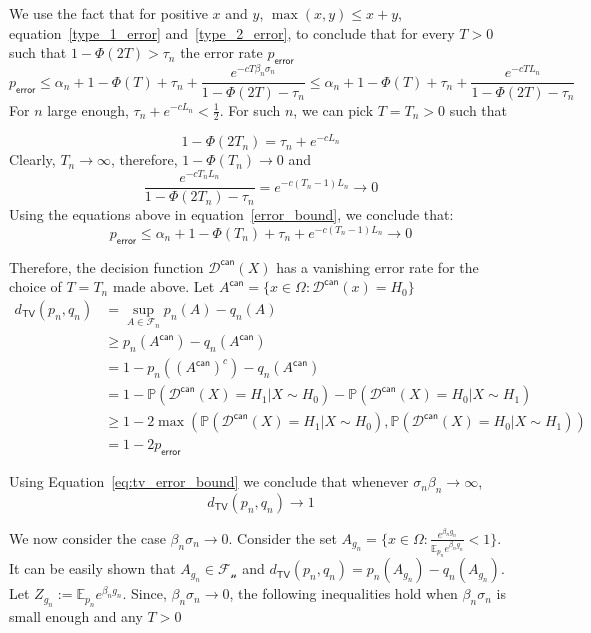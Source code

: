 \documentclass[final,12pt]{colt2018}
\begin{document}
We use the fact that for positive $x$ and $y$, $\max(x,y) \leq x+y$, equation~\eqref{type_1_error} and~\eqref{type_2_error}, to conclude that for every $T >0$ such that $1-\Phi(2T) > \tau_n$ the error rate $p_{\mathsf{error}}$
\begin{equation}
p_{\mathsf{error}}  \leq \alpha_n + 1 - \Phi(T) + \tau_n + \frac{e^{-cT\beta_n\sigma_n }}{1-\Phi(2T) - \tau_n} \leq \alpha_n + 1 - \Phi(T) + \tau_n + \frac{e^{-cTL_n }}{1-\Phi(2T) - \tau_n}   \label{error_bound}
\end{equation}
For $n$ large enough, $\tau_n + e^{-cL_n} < \frac{1}{2}$. For such $n$, we can pick $T = T_n > 0$ such that

$$1-\Phi(2T_n) = \tau_n + e^{-cL_n}$$
Clearly, $T_n \to \infty$, therefore, $1-\Phi(T_n) \to 0$ and $$\frac{e^{-cT_nL_n }}{1-\Phi(2T_n) - \tau_n} = e^{-c(T_n-1)L_n } \to 0$$
Using the equations above in equation~\eqref{error_bound}, we conclude that:
$$p_{\mathsf{error}} \leq \alpha_n + 1 - \Phi(T_n) + \tau_n + e^{-c(T_n-1)L_n} \to 0$$

Therefore, the decision function $\mathcal{D}^{\mathsf{can}}(X)$ has a vanishing error rate for the choice of $T = T_n$ made above. Let $A^{\mathsf{can}} = \{x\in \Omega: \mathcal{D}^{\mathsf{can}}(x) = H_0\}$ 
\begin{align}
d_{\mathsf{TV}}(p_n,q_n) &= \sup_{A \in \mathcal{F}_n}p_n(A)-q_n(A)\nonumber \\
&\geq p_n(A^{\mathsf{can}}) - q_n(A^{\mathsf{can}})\nonumber \\
&=1- p_n\left((A^{\mathsf{can}})^{c}\right) - q_n(A^{\mathsf{can}})\nonumber \\
&= 1 - \mathbb{P}(\mathcal{D}^{\mathsf{can}}(X) = H_1| X \sim H_0) - \mathbb{P}(\mathcal{D}^{\mathsf{can}}(X) = H_0| X \sim H_1)\nonumber\\
&\geq 1 - 2\max(\mathbb{P}(\mathcal{D}^{\mathsf{can}}(X) = H_1| X \sim H_0),\mathbb{P}(\mathcal{D}^{\mathsf{can}}(X) = H_0| X \sim H_1))\nonumber\\
&= 1-2p_{\mathsf{error}} \label{eq:tv_error_bound}
\end{align}

Using Equation~\eqref{eq:tv_error_bound} we conclude that whenever $\sigma_n\beta_n \to \infty$,
$$d_{\mathsf{TV}}(p_n,q_n) \to 1$$ 


We now consider the case $\beta_n\sigma_n \to 0$.
Consider the set $A_{g_n} = \{x \in \Omega : \frac{e^{\beta_n g_n}}{\mathbb{E}_{p_n} e^{\beta_n g_n}} < 1\}$. It can be easily shown that $A_{g_n} \in \mathcal{F_n}$ and $d_{\mathsf{TV}}(p_n,q_n ) = p_n(A_{g_n}) - q_n(A_{g_n})$. Let $Z_{g_n} := \mathbb{E}_{p_n} e^{\beta_n g_n}$. Since, $\beta_n\sigma_n \to 0$, the following inequalities hold when $\beta_n\sigma_n$ is small enough and any $T >0$
\end{document}
